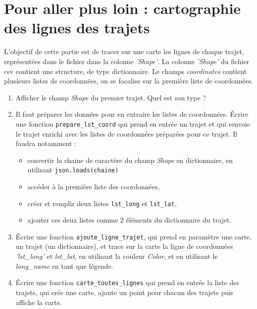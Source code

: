 \documentclass[11pt,a4paper]{article}
\begin{document}
\section{Pour aller plus loin : cartographie des lignes des trajets}
L'objectif de cette partie est de tracer sur une carte les lignes de chaque trajet, représentées dans le fichier dans la colonne \emph{'Shape'}. La colonne  \emph{'Shape'} du fichier csv contient une structure, de type dictionnaire. Le champs \emph{coordinates} contient plusieurs listes de coordonnées, on se focalise sur la première liste de coordonnées.
 \begin{enumerate}
 \item Afficher le champ \emph{Shape} du premier trajet. Quel est son type ? 
 \item Il faut préparer les données pour en extraire les listes de coordonnées. Écrire une fonction \verb+prepare_lst_coord+ qui prend en entrée un trajet
 et qui renvoie le trajet enrichi avec les listes de coordonnées préparées pour ce trajet. 
 Il faudra notamment : 
  \begin{itemize}
    \item convertir la chaine de caractère du champ \emph{Shape} en dictionnaire, en utilisant \verb+json.loads(chaine)+
    \item accéder à la première liste des coordonnées,
    \item créer et remplir deux listes \verb+lst_long+ et \verb+lst_lat+,
    \item ajouter ces deux listes comme 2 éléments du dictionnaire du trajet.
  \end{itemize}
\item Écrire une fonction \verb+ajoute_ligne_trajet+, qui prend en paramètre une carte, un trajet (un dictionnaire), et trace sur la carte la ligne de coordonnées \emph{'lst\_long'} et \emph{lst\_lat},
 en utilisant la couleur \emph{Color}, et en utilisant le \emph{long\_name} en tant que légende.
 \item Écrire une fonction \verb+carte_toutes_lignes+ qui prend en entrée la liste des trajets, qui crée une carte, ajoute un point pour chacun des trajets puis affiche la carte.

 \end{enumerate}
\end{document}

